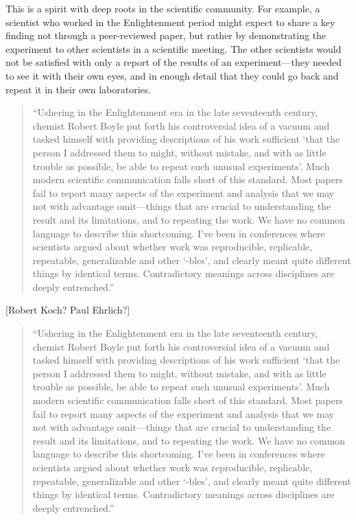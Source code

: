 \documentclass[]{tufte-book}
\begin{document}
This is a spirit with deep roots in the scientific community. For example,
a scientist who worked in the Enlightenment period might expect to share
a key finding not through a peer-reviewed paper, but rather by demonstrating
the experiment to other scientists in a scientific meeting. The other
scientists would not be satisfied with only a report of the results of
an experiment---they needed to see it with their own eyes, and in enough
detail that they could go back and repeat it in their own laboratories.

\begin{quote}
``Ushering in the Enlightenment era in the late seventeenth century, chemist
Robert Boyle put forth his controversial idea of a vacuum and tasked himself
with providing descriptions of his work sufficient `that the person I addressed
them to might, without mistake, and with as little trouble as possible, be able
to repeat such unusual experiments'. Much modern scientific communication falls
short of this standard. Most papers fail to report many aspects of the
experiment and analysis that we may not with advantage omit---things that are
crucial to understanding the result and its limitations, and to repeating the
work. We have no common language to describe this shortcoming. I've been in
conferences where scientists argued about whether work was reproducible,
replicable, repeatable, generalizable and other `-bles', and clearly meant quite
different things by identical terms. Contradictory meanings across disciplines
are deeply entrenched.'' \citep{stark2018before}
\end{quote}

{[}Robert Koch? Paul Ehrlich?{]}

\begin{quote}
``Ushering in the Enlightenment era in the late seventeenth century, chemist
Robert Boyle put forth his controversial idea of a vacuum and tasked himself
with providing descriptions of his work sufficient `that the person I addressed
them to might, without mistake, and with as little trouble as possible, be able
to repeat such unusual experiments'. Much modern scientific communication falls
short of this standard. Most papers fail to report many aspects of the
experiment and analysis that we may not with advantage omit---things that are
crucial to understanding the result and its limitations, and to repeating the
work. We have no common language to describe this shortcoming. I've been in
conferences where scientists argued about whether work was reproducible,
replicable, repeatable, generalizable and other `-bles', and clearly meant quite
different things by identical terms. Contradictory meanings across disciplines
are deeply entrenched.'' \citep{stark2018before}
\end{quote}
\end{document}
